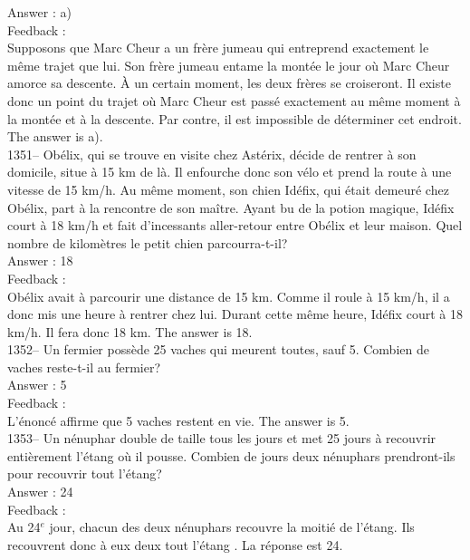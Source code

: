\documentclass[letterpaper, 12pt]{article}
\begin{document}
Answer : a)\\

Feedback : \\
Supposons que Marc Cheur a un fr\`ere jumeau qui entreprend exactement le
m\^eme trajet que lui.  Son fr\`ere jumeau entame la mont\'ee le jour o\`u
Marc Cheur amorce sa descente.  \`A un certain moment, les deux fr\`eres se
croiseront.  Il existe donc un point du trajet o\`u Marc Cheur est pass\'e
exactement au m\^eme moment \`a la mont\'ee et \`a la descente.  Par contre,
il est impossible de d\'eterminer cet endroit.  The answer is a).\\

1351-- Ob\'elix, qui se trouve en visite chez Ast\'erix, d\'ecide de rentrer
\`a son domicile, situe \`a 15 km de l\`a. Il enfourche donc son v\'elo et
prend la route \`a une vitesse de 15 km/h.  Au m\^eme moment, son chien
Id\'efix, qui \'etait demeur\'e chez Ob\'elix, part \`a la rencontre de son
ma\^itre.  Ayant bu de la potion magique, Id\'efix court \`a 18 km/h et fait
d'incessants aller-retour entre Ob\'elix et leur maison.  Quel nombre de
kilom\`etres le petit chien parcourra-t-il?\\

Answer : 18\\

Feedback : \\
Ob\'elix avait \`a parcourir une distance de 15 km.  Comme il roule \`a 15
km/h, il a donc mis une heure \`a rentrer chez lui.  Durant cette m\^eme
heure, Id\'efix court \`a 18 km/h. Il fera donc 18 km.  The answer is
18.\\

1352-- Un fermier poss\`ede 25 vaches qui meurent toutes, sauf 5.  Combien
de vaches reste-t-il au fermier?\\

Answer : 5\\

Feedback :\\
L'\'enonc\'e affirme que 5 vaches restent en vie.  The answer is
5.\\

1353-- Un n\'enuphar double de taille tous les jours et met 25 jours \`a
recouvrir enti\`erement l'\'etang o\`u il pousse.  Combien de jours deux
n\'enuphars prendront-ils pour recouvrir tout l'\'etang?\\

Answer : 24\\

Feedback : \\
Au 24$^e$ jour, chacun des deux n\'enuphars recouvre la moiti\'e de
l'\'etang.  Ils recouvrent donc \`a eux deux tout l'\'etang . La r\'eponse
est 24.  \\
\end{document}
